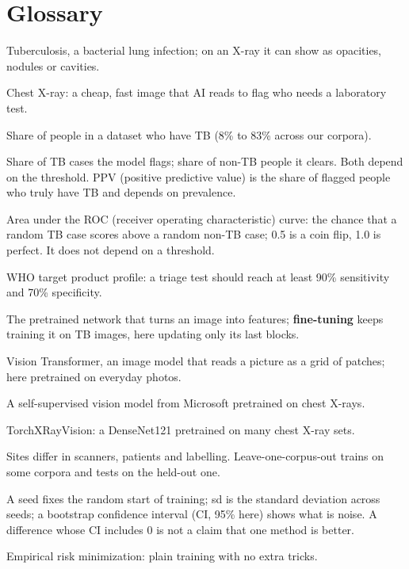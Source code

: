 \documentclass[10pt,a4paper]{article}
\begin{document}
\section{Glossary}\label{app:glossary}
\begin{description}[leftmargin=2.2cm,labelwidth=2cm,itemsep=2pt,font=\bfseries]
\item[TB] Tuberculosis, a bacterial lung infection; on an X-ray it can show as opacities, nodules or cavities.
\item[CXR] Chest X-ray: a cheap, fast image that AI reads to flag who needs a laboratory test.
\item[Prevalence] Share of people in a dataset who have TB (8\% to 83\% across our corpora).
\item[Sensitivity, specificity] Share of TB cases the model flags; share of non-TB people it clears. Both depend on the threshold. PPV (positive predictive value) is the share of flagged people who truly have TB and depends on prevalence.
\item[AUROC] Area under the ROC (receiver operating characteristic) curve: the chance that a random TB case scores above a random non-TB case; 0.5 is a coin flip, 1.0 is perfect. It does not depend on a threshold.
\item[WHO TPP] WHO target product profile: a triage test should reach at least 90\% sensitivity and 70\% specificity.
\item[Backbone] The pretrained network that turns an image into features; \textbf{fine-tuning} keeps training it on TB images, here updating only its last blocks.
\item[ViT] Vision Transformer, an image model that reads a picture as a grid of patches; here pretrained on everyday photos.
\item[RAD-DINO] A self-supervised vision model from Microsoft pretrained on chest X-rays.
\item[xrv] TorchXRayVision: a DenseNet121 pretrained on many chest X-ray sets.
\item[Domain shift, LOCO] Sites differ in scanners, patients and labelling. Leave-one-corpus-out trains on some corpora and tests on the held-out one.
\item[Seed, sd, CI] A seed fixes the random start of training; sd is the standard deviation across seeds; a bootstrap confidence interval (CI, 95\% here) shows what is noise. A difference whose CI includes 0 is not a claim that one method is better.
\item[ERM] Empirical risk minimization: plain training with no extra tricks.

\end{description}
\end{document}
